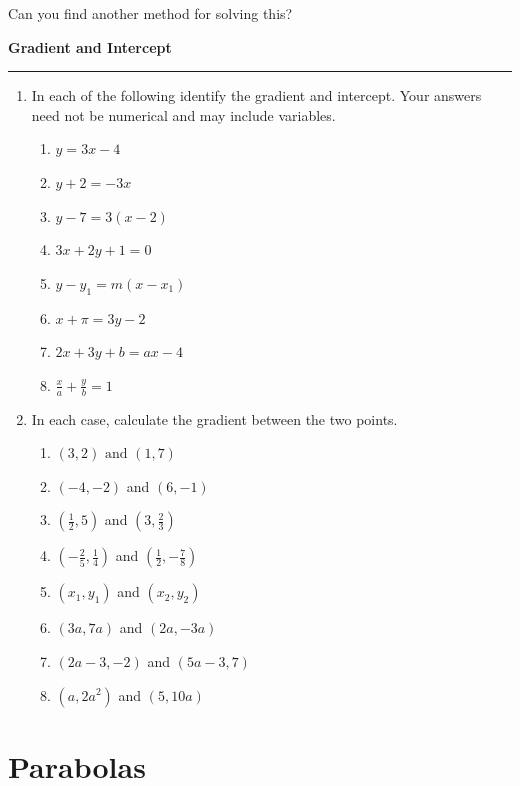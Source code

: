 \documentclass[]{article}
\begin{document}
\noindent Can you find another method for solving this?

\newpage

\noindent \textbf{Gradient and Intercept}

\medskip
\hrule
\medskip

\begin{enumerate}
    \item In each of the following identify the gradient and intercept. Your answers need not be numerical and may include variables.
    \begin{enumerate}
        \item \(y=3x-4\)
        \item \(y+2=-3x\)
        \item \(y-7=3(x-2)\)
        \item \(3x+2y+1=0\)
        \item \(y-y_1=m(x-x_1)\)
        \item \(x+\pi=3y-2\)
        \item \(2x+3y + b= ax - 4\)
        \item \(\frac{x}{a}+\frac{y}{b}=1\)
    \end{enumerate}

    \item In each case, calculate the gradient between the two points.

    \begin{enumerate}
        \item  \((3,2) \text{ and } (1,7)\)
        \item \((-4, -2)\) and \((6,-1)\)
        \item \((\frac{1}{2}, 5)\) and \((3, \frac{2}{3})\)
        \item \((-\frac{2}{5}, \frac{1}{4})\) and \((\frac{1}{2}, -\frac{7}{8})\)
        \item \((x_1,y_1)\) and \((x_2,y_2)\)
        \item \((3a, 7a)\) and \((2a, -3a)\)
        \item \((2a-3,-2)\) and \((5a-3,7)\)
        \item \( (a,2a^2) \) and \((5,10a)\)
    \end{enumerate}

\end{enumerate}

\newpage

\section{Parabolas}
\end{document}
